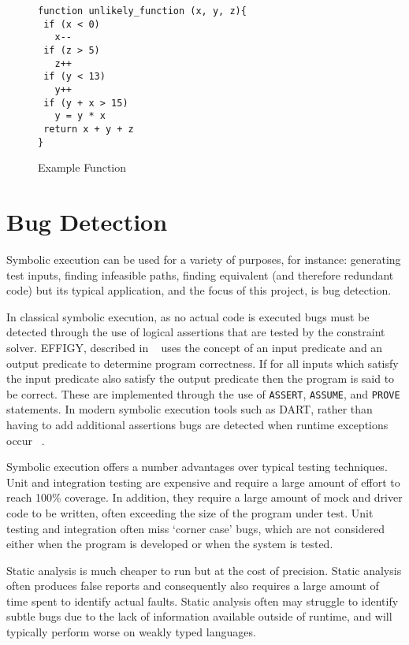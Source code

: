 \documentclass[]{final_report}
\begin{document}
\begin{figure}[h]
\begin{verbatim}
function unlikely_function (x, y, z){
 if (x < 0)
   x--
 if (z > 5)
   z++
 if (y < 13)
   y++
 if (y + x > 15)
   y = y * x
 return x + y + z
}
\end{verbatim}
\caption{\label{fig:example-function} Example Function}
\end{figure} 

\section{Bug Detection}

Symbolic execution can be used for a variety of purposes, for instance: generating test inputs, finding infeasible paths,  finding equivalent (and therefore redundant code) but its typical application, and the focus of this project, is bug detection. 

In classical symbolic execution, as no actual code is executed bugs must be detected through the use of logical assertions that are tested by the constraint solver.  EFFIGY, described in ~\cite{king1976symbolic} uses the concept of an input predicate and an output predicate to determine program correctness. If for all inputs which satisfy the input predicate also satisfy the output predicate then the program is said to be correct. These are implemented through the use of \lstinline{ASSERT}, \lstinline{ASSUME}, and \lstinline{PROVE} statements.  In modern symbolic execution tools such as DART, rather than having to add additional assertions bugs are detected when runtime exceptions occur ~\cite{godefroid2005dart}.

Symbolic execution offers a number advantages over typical testing techniques. Unit and integration testing are expensive and require a large amount of effort to reach 100\% coverage. In addition, they require a large amount of mock and driver code to be written, often exceeding the size of the program under test. Unit testing and integration often miss `corner case' bugs, which are not considered either when the program is developed or when the system is tested.

Static analysis is much cheaper to run but at the cost of precision. Static analysis often produces false reports and consequently also requires a large amount of time spent to identify actual faults. Static analysis often may struggle to identify subtle bugs due to the lack of information available outside of runtime, and will typically perform worse on weakly typed languages.
\end{document}
